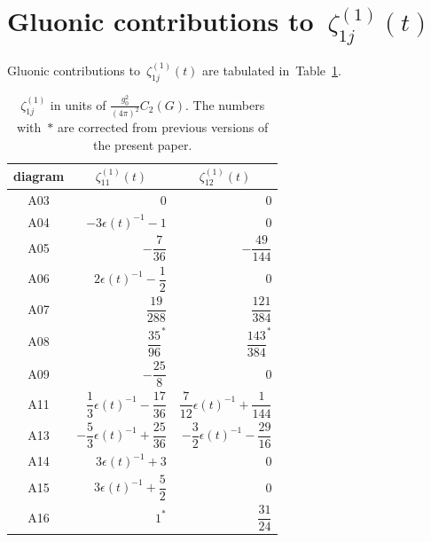 \section{Gluonic contributions to~$\zeta_{1j}^{(1)}(t)$}
\label{sec:C}
Gluonic contributions to~$\zeta_{1j}^{(1)}(t)$ are tabulated
in~Table~\ref{table:0}.
\begin{table}
\caption{$\zeta_{1j}^{(1)}$ in units of $\frac{g_0^2}{(4\pi)^2}C_2(G)$.
The numbers with~$*$ are corrected from previous versions of the present paper.
}
\label{table:0}
\begin{center}
\renewcommand{\arraystretch}{2.2}
\setlength{\tabcolsep}{20pt}
\begin{tabular}{crr}
\toprule
 diagram & \multicolumn{1}{c}{$\zeta_{11}^{(1)}(t)$}
 & \multicolumn{1}{c}{$\zeta_{12}^{(1)}(t)$} \\
\midrule
A03  & $0$ & $0$ \\
A04  & $-3\epsilon(t)^{-1}-1$ & $0$ \\
A05  & $-\dfrac{7}{36}$ & $-\dfrac{49}{144}$ \\
A06  & $2\epsilon(t)^{-1}-\dfrac{1}{2}$ & $0$ \\
A07  & $\dfrac{19}{288}$ & $\dfrac{121}{384}$ \\
A08  & $\dfrac{35}{96}^*$ & $\dfrac{143}{384}^*$ \\
A09  & $-\dfrac{25}{8}$ & $0$ \\
A11  & $\dfrac{1}{3}\epsilon(t)^{-1}-\dfrac{17}{36}$ & $\dfrac{7}{12}\epsilon(t)^{-1}+\dfrac{1}{144}$ \\
A13  & $-\dfrac{5}{3}\epsilon(t)^{-1}+\dfrac{25}{36}$ & $-\dfrac{3}{2}\epsilon(t)^{-1}-\dfrac{29}{16}$ \\
A14  & $3\epsilon(t)^{-1}+3$ & $0$ \\
A15  & $3\epsilon(t)^{-1}+\dfrac{5}{2}$ & $0$ \\
A16  & $1^*$ & $\dfrac{31}{24}$ \\
\bottomrule
\end{tabular}
\end{center}
\end{table}

